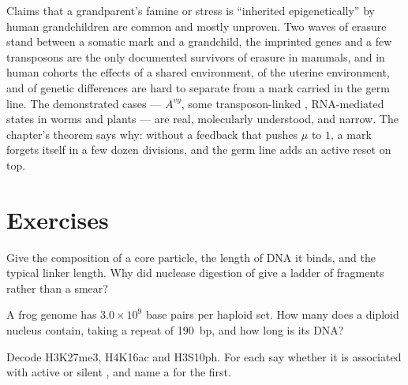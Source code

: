 \begin{remark}\label{rem:b3:chromatin-epigenetics:limits}
Claims that a grandparent's famine or stress is ``inherited
epigenetically'' by human grandchildren are common and mostly
unproven. Two waves of erasure stand between a somatic mark and a
grandchild, the imprinted genes and a few transposons are the only
documented survivors of erasure in mammals, and in human cohorts the
effects of a shared environment, of the uterine environment, and of
genetic differences are hard to separate from a mark carried in the
germ line. The demonstrated cases --- $A^{vy}$, some transposon-linked
, RNA-mediated states in worms and plants --- are real,
molecularly understood, and narrow. The chapter's theorem says why:
without a feedback that pushes $\mu$ to $1$, a mark forgets itself in
a few dozen divisions, and the germ line adds an active reset on top.
\end{remark}

\section{Exercises}

\begin{exercise}[$\star$]\label{exo:b3:chromatin-epigenetics:1}
Give the composition of a  core particle, the length of DNA
it binds, and the typical linker length. Why did nuclease digestion of
 give a ladder of fragments rather than a smear?
\end{exercise}

\begin{exercise}[$\star$]\label{exo:b3:chromatin-epigenetics:2}
A frog genome has $3.0\times 10^{9}$ base pairs per haploid set. How
many  does a diploid nucleus contain, taking a repeat of
\qty{190}{bp}, and how long is its DNA?
\end{exercise}

\begin{exercise}[$\star$]\label{exo:b3:chromatin-epigenetics:3}
Decode H3K27me3, H4K16ac and H3S10ph. For each say whether it is
associated with active or silent , and name a  for the
first.
\end{exercise}

